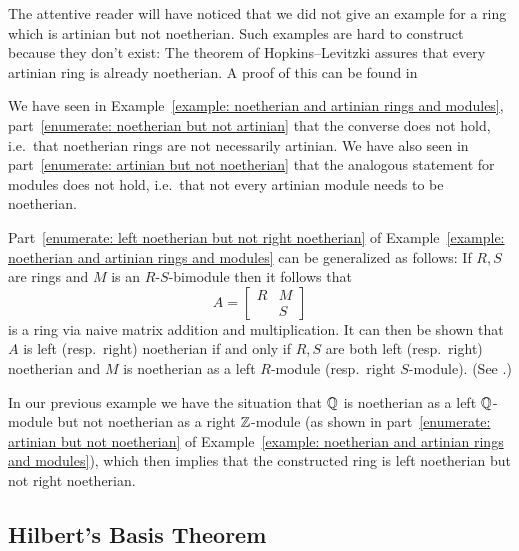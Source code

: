 \begin{remark}
  The attentive reader will have noticed that we did not give an example for a ring which is artinian but not noetherian.
  Such examples are hard to construct because they don’t exist:
  The theorem of Hopkins--Levitzki assures that every artinian ring is already noetherian.
  A proof of this can be found in \cite[Theorem~4.15]{Lam1991First}
  
  We have seen in Example~\ref{example: noetherian and artinian rings and modules}, part~\ref*{enumerate: noetherian but not artinian} that the converse does not hold, i.e.\ that noetherian rings are not necessarily artinian.
  We have also seen in part~\ref*{enumerate: artinian but not noetherian} that the analogous statement for modules does not hold, i.e.\ that not every artinian module needs to be noetherian.
\end{remark}


\begin{remark}
  Part~\ref*{enumerate: left noetherian but not right noetherian} of Example~\ref{example: noetherian and artinian rings and modules} can be generalized as follows:
  If $R, S$ are rings and $M$ is an $R$-$S$-bimodule then it follows that
  \[
      A
    = \begin{bmatrix}
        R & M \\
          & S
      \end{bmatrix}
  \]
  is a ring via naive matrix addition and multiplication.
  It can then be shown that $A$ is left (resp.\ right) noetherian if and only if $R, S$ are both left (resp.\ right) noetherian and $M$ is noetherian as a left $R$-module (resp.\ right $S$-module).
  (See \cite[Theorem~1.22]{Lam1991First}.)
  
  In our previous example we have the situation that $\mathbb{Q}$ is noetherian as a left $\mathbb{Q}$-module but not noetherian as a right $\mathbb{Z}$-module (as shown in part~\ref*{enumerate: artinian but not noetherian} of Example~\ref{example: noetherian and artinian rings and modules}), which then implies that the constructed ring is left noetherian but not right noetherian.
\end{remark}






\subsection{Hilbert’s Basis Theorem}


